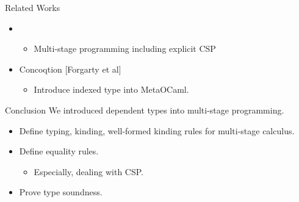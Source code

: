 \documentclass[dvipdfmx,aspectratio=169, 20pt]{beamer}
\begin{document}
\begin{frame}[fragile]{Related Works}
    \begin{itemize}
        \item {}
            \begin{itemize}
                \item Multi-stage programming including explicit CSP
            \end{itemize}
        \item Concoqtion [Forgarty et al]
            \begin{itemize}
                \item Introduce indexed type into MetaOCaml.
            \end{itemize}
    \end{itemize}
    \note{
    }
\end{frame}

\begin{frame}[fragile]{Conclusion}
    We introduced dependent types into multi-stage programming.
    \begin{itemize}
        \item Define typing, kinding, well-formed kinding rules for multi-stage calculus.
            \item Define equality rules.
                \begin{itemize}
                        \item Especially, dealing with CSP.
                \end{itemize}
            \item Prove type soundness.
        \end{itemize}
    \note{
    }
\end{frame}

\end{document}
